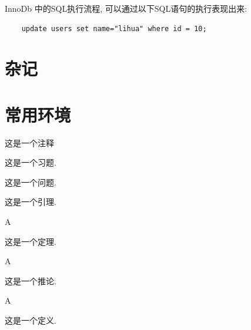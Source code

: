 \documentclass[a4,10pt]{ctexart}
\begin{document}
InnoDb 中的SQL执行流程, 可以通过以下SQL语句的执行表现出来:

\begin{verbatim}
	update users set name="lihua" where id = 10;
\end{verbatim}







\section{杂记}

\section{常用环境}

\begin{zs}
        
这是一个注释
    
\end{zs}
    
\begin{xt}
        
这是一个习题.
    
\end{xt}
    
\begin{lt}
        
这是一个问题.
    
\end{lt}

\begin{yl}
        
这是一个引理.
    
\end{yl}

\begin{dl}{A}{}
        
这是一个定理.
    
\end{dl}
    
\begin{tl}{A}{}
        
这是一个推论.
    
\end{tl}

\begin{dy}{A}{}
        
这是一个定义.
    
\end{dy}
\end{document}

